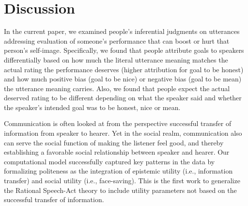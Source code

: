 \documentclass[10pt,letterpaper]{article}
\begin{document}
\section{Discussion}

In the current paper, we examined people's inferential judgments on utterances addressing evaluation of someone's performance that can boost or hurt that person's self-image. Specifically, we found that people attribute goals to speakers differentially based on how much the literal utterance meaning matches the actual rating the performance deserves (higher attribution for goal to be honest) and how much positive bias (goal to be nice) or negative bias (goal to be mean) the utterance meaning carries. Also, we found that people expect the actual deserved rating to be different depending on what the speaker said and whether the speaker's intended goal was to be honest, nice or mean. 

Communication is often looked at from the perspective successful transfer of information from speaker to hearer. 
Yet in the social realm, communication also can serve the social function of making the listener feel good, and thereby establishing a favorable social relationship between speaker and hearer.
Our computational model successfully captured key patterns in the data by formalizing politeness as the integration of epistemic utility (i.e., information transfer) and social utility (i.e., face-saving). This is the first work to generalize the Rational Speech-Act theory to include utility parameters not based on the successful transfer of information. 





\setlength{\bibleftmargin}{.125in}
\setlength{\bibindent}{-\bibleftmargin}


\end{document}
